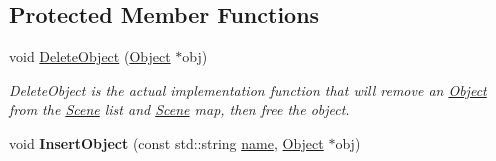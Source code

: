 \subsection*{Protected Member Functions}
\begin{DoxyCompactItemize}
\item 
void \hyperlink{class_scene_a8bbe0e5b1bfc71034b18e240e86aa285}{Delete\-Object} (\hyperlink{class_object}{Object} $\ast$obj)
\begin{DoxyCompactList}\small\item\em Delete\-Object is the actual implementation function that will remove an \hyperlink{class_object}{Object} from the \hyperlink{class_scene}{Scene} list and \hyperlink{class_scene}{Scene} map, then free the object. \end{DoxyCompactList}\item 
\hypertarget{class_scene_ae8d51ddc196248a7cbd1f3640851dbd4}{void {\bfseries Insert\-Object} (const std\-::string \hyperlink{class_object_a24457e0a387492c80594aec7681a2277}{name}, \hyperlink{class_object}{Object} $\ast$obj)}\label{class_scene_ae8d51ddc196248a7cbd1f3640851dbd4}

\end{DoxyCompactItemize}

